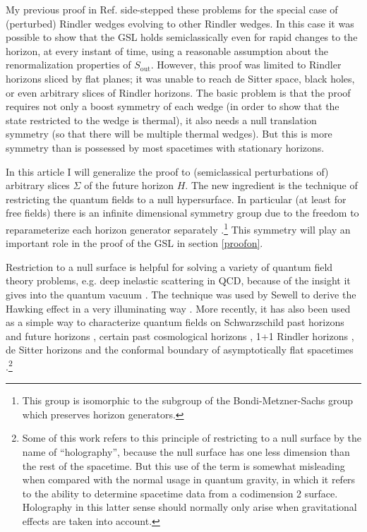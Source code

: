 \documentclass[12pt]{article}
\begin{document}
My previous proof in Ref. \cite{rindler} side-stepped these problems for the special case of (perturbed) Rindler wedges evolving to other Rindler wedges.  In this case it was possible to show that the GSL holds semiclassically even for rapid changes to the horizon, at every instant of time, using a reasonable assumption about the renormalization properties of $S_\mathrm{out}$.  However, this proof was limited to Rindler horizons sliced by flat planes; it was unable to reach de Sitter space, black holes, or even arbitrary slices of Rindler horizons.  The basic problem is that the proof requires not only a boost symmetry of each wedge (in order to show that the state restricted to the wedge is thermal), it also needs a null translation symmetry (so that there will be multiple thermal wedges).  But this is more symmetry than is possessed by most spacetimes with stationary horizons.

In this article I will generalize the proof to (semiclassical perturbations of) arbitrary slices $\Sigma$ of the future horizon $H$.  The new ingredient is the technique of restricting the quantum fields to a null hypersurface.  In particular (at least for free fields) there is an infinite dimensional symmetry group due to the freedom to reparameterize each horizon generator separately \cite{schroer09}.\footnote{This group is isomorphic to the subgroup of the Bondi-Metzner-Sachs group which preserves horizon generators.}  This symmetry will play an important role in the proof of the GSL in section \ref{proofon}.

Restriction to a null surface is helpful for solving a variety of quantum field theory problems, e.g. deep inelastic scattering in QCD, because of the insight it gives into the quantum vacuum \cite{burkardt96}.  The technique was used by Sewell to derive the Hawking effect in a very illuminating way \cite{sewell82}.  More recently, it has also been used as a simple way to characterize quantum fields on Schwarzschild past horizons \cite{DMP09} and future horizons \cite{MP03}, certain past cosmological horizons \cite{DMP08}, 1+1 Rindler horizons \cite{MP04}, de Sitter horizons \cite{pinamonti05} and the conformal boundary of asymptotically flat spacetimes \cite{moretti05}.\footnote{Some of this work refers to this principle of restricting to a null surface by the name of ``holography'', because the null surface has one less dimension than the rest of the spacetime.  But this use of the term is somewhat misleading when compared with the normal usage in quantum gravity, in which it refers to the ability to determine spacetime data from a codimension 2 surface.  Holography in this latter sense should normally only arise when gravitational effects are taken into account.}
\end{document}
